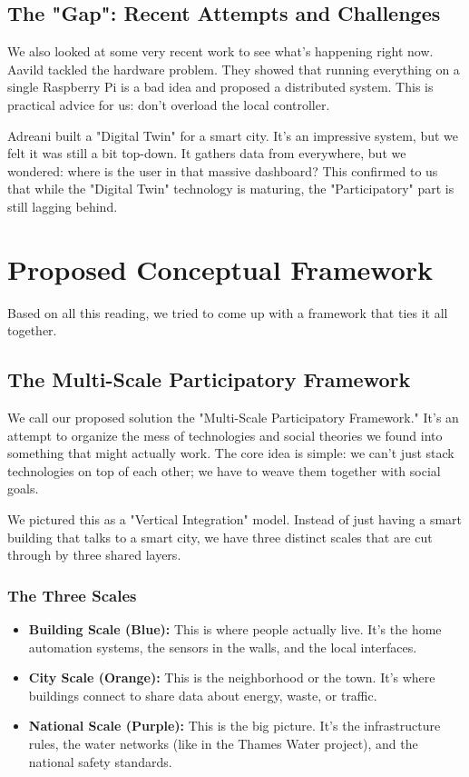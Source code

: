 \documentclass[a4paper,oneside,12pt]{report}
\begin{document}
\section{The "Gap": Recent Attempts and Challenges}
We also looked at some very recent work to see what's happening right now. Aavild\cite{Aavild2024} tackled the hardware problem. They showed that running everything on a single Raspberry Pi is a bad idea and proposed a distributed system. This is practical advice for us: don't overload the local controller.

Adreani\cite{Adreani2024} built a "Digital Twin" for a smart city. It's an impressive system, but we felt it was still a bit top-down. It gathers data from everywhere, but we wondered: where is the user in that massive dashboard? This confirmed to us that while the "Digital Twin" technology is maturing, the "Participatory" part is still lagging behind.

\chapter{Proposed Conceptual Framework}

Based on all this reading, we tried to come up with a framework that ties it all together.

\section{The Multi-Scale Participatory Framework}
We call our proposed solution the "Multi-Scale Participatory Framework." It's an attempt to organize the mess of technologies and social theories we found into something that might actually work. The core idea is simple: we can't just stack technologies on top of each other; we have to weave them together with social goals.

We pictured this as a "Vertical Integration" model. Instead of just having a smart building that talks to a smart city, we have three distinct scales that are cut through by three shared layers.

\subsection{The Three Scales}
\begin{itemize}
    \item \textbf{Building Scale (Blue):} This is where people actually live. It's the home automation systems, the sensors in the walls, and the local interfaces.
    \item \textbf{City Scale (Orange):} This is the neighborhood or the town. It's where buildings connect to share data about energy, waste, or traffic.
    \item \textbf{National Scale (Purple):} This is the big picture. It's the infrastructure rules, the water networks (like in the Thames Water project), and the national safety standards.
\end{itemize}
\end{document}
